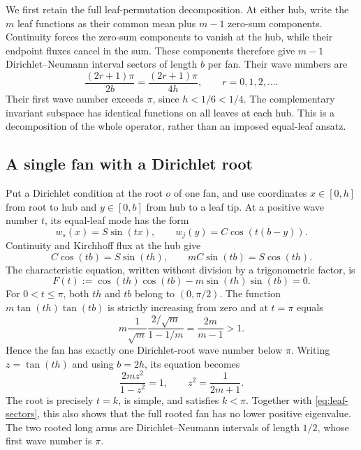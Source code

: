 \documentclass[11pt]{article}
\numberwithin{equation}{section}
\theoremstyle{remark}
\begin{document}
We first retain the full leaf-permutation decomposition.
At either hub, write the \(m\) leaf functions as their common mean
plus \(m-1\) zero-sum components. Continuity forces the zero-sum
components to vanish at the hub, while their endpoint fluxes cancel
in the sum. These components therefore give \(m-1\)
Dirichlet--Neumann interval sectors of length \(b\) per fan.
Their wave numbers are
\begin{equation}\label{eq:leaf-sectors}
  \frac{(2r+1)\pi}{2b}=\frac{(2r+1)\pi}{4h},
  \qquad r=0,1,2,\ldots.
\end{equation}
Their first wave number exceeds \(\pi\), since \(h<1/6<1/4\).
The complementary invariant subspace has identical functions on
all leaves at each hub. This is a decomposition of the whole
operator, rather than an imposed equal-leaf ansatz.

\subsection{A single fan with a Dirichlet root}

Put a Dirichlet condition at the root \(o\) of one fan, and use
coordinates \(x\in[0,h]\) from root to hub and \(y\in[0,b]\)
from hub to a leaf tip. At a positive wave number \(t\), its
equal-leaf mode has the form
\[
  w_s(x)=S\sin(tx),\qquad
  w_j(y)=C\cos(t(b-y)).
\]
Continuity and Kirchhoff flux at the hub give
\begin{equation}\label{eq:fan-matching}
  C\cos(tb)=S\sin(th),\qquad
  mC\sin(tb)=S\cos(th).
\end{equation}
The characteristic equation, written without division by a
trigonometric factor, is
\begin{equation}\label{eq:fan-char}
  F(t):=\cos(th)\cos(tb)-m\sin(th)\sin(tb)=0.
\end{equation}
For \(0<t\leq\pi\), both \(th\) and \(tb\) belong to \((0,\pi/2)\).
The function \(m\tan(th)\tan(tb)\) is strictly increasing from zero
and at \(t=\pi\) equals
\[
  m\frac{1}{\sqrt m}\frac{2/\sqrt m}{1-1/m}
  =\frac{2m}{m-1}>1.
\]
Hence the fan has exactly one Dirichlet-root wave number below \(\pi\).
Writing \(z=\tan(th)\) and using \(b=2h\), its equation becomes
\[
  \frac{2mz^2}{1-z^2}=1,\qquad z^2=\frac{1}{2m+1}.
\]
The root is precisely \(t=k\), is simple, and satisfies \(k<\pi\).
Together with \eqref{eq:leaf-sectors}, this also shows that the full
rooted fan has no lower positive eigenvalue. The two rooted long arms
are Dirichlet--Neumann intervals of length \(1/2\), whose first wave
number is \(\pi\).
\end{document}
